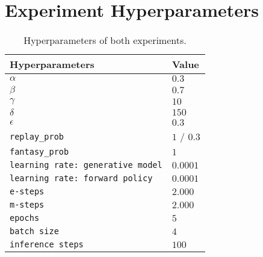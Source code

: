 \clearpage
\section{Experiment Hyperparameters}\label{app:hyperparams}
\begin{table}[H]
    \centering
    \begin{tabular}{|l|l|}
        \hline
        \textbf{Hyperparameters} & \textbf{Value} \\\hline
        $\alpha$ & $0.3$ \\\hline
        $\beta$ & $0.7$ \\\hline
        $\gamma$ & $10$ \\\hline
        $\delta$ & $150$ \\\hline 
        $\epsilon$ & $0.3$ \\\hline 
        \texttt{replay\_prob} & $1$ / $0.3$ \\\hline 
        \texttt{fantasy\_prob} & $1$ \\\hline 
        \texttt{learning rate: generative model} & $0.0001$ \\\hline 
        \texttt{learning rate: forward policy} & $0.0001$ \\\hline 
        \texttt{e-steps} & $2.000$ \\\hline 
        \texttt{m-steps} & $2.000$ \\\hline 
        \texttt{epochs} & $5$ \\\hline 
        \texttt{batch size} & $4$ \\\hline 
        \texttt{inference steps} & $100$ \\\hline 
    \end{tabular}
    \caption{Hyperparameters of both experiments.}
    \label{tab:hyperparams}
\end{table}

\clearpage
